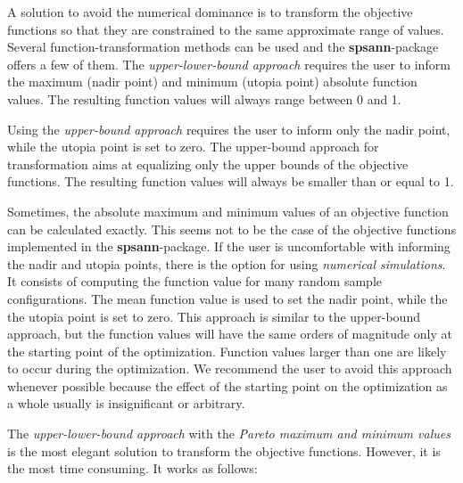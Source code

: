 A solution to avoid the numerical dominance is to transform the objective
functions so that they are constrained to the same approximate range of 
values. Several function-transformation methods can be used and the 
\textbf{spsann}-package offers a few of them. The \textit{upper-lower-bound 
approach} requires the user to inform the maximum (nadir point) and minimum 
(utopia point) absolute function values. The resulting function values will 
always range between 0 and 1.

Using the \textit{upper-bound approach} requires the user to inform only the
nadir point, while the utopia point is set to zero. The upper-bound approach
for transformation aims at equalizing only the upper bounds of the objective 
functions. The resulting function values will always be smaller than or equal
to 1.

Sometimes, the absolute maximum and minimum values of an objective function 
can be calculated exactly. This seems not to be the case of the objective 
functions implemented in the \textbf{spsann}-package. If the user is 
uncomfortable with informing the nadir and utopia points, there is the option
for using \textit{numerical simulations}. It consists of computing the 
function value for many random sample configurations. The mean function 
value is used to set the nadir point, while the the utopia point is set to
zero. This approach is similar to the upper-bound approach, but the function
values will have the same orders of magnitude only at the starting point of 
the optimization. Function values larger than one are likely to occur during 
the optimization. We recommend the user to avoid this approach whenever 
possible because the effect of the starting point on the optimization as a 
whole usually is insignificant or arbitrary.

The \textit{upper-lower-bound approach} with the \textit{Pareto maximum and 
minimum values} is the most elegant solution to transform the objective 
functions. However, it is the most time consuming. It works as follows:


